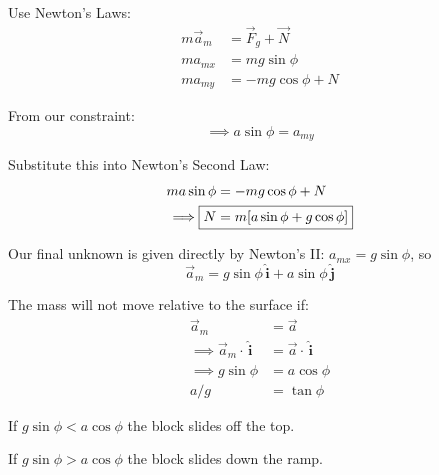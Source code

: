 \documentclass[twoside]{scrartcl}
\let\oldhat\hat
\renewcommand{\hat}[1]{\,\oldhat{\boldsymbol{\mathbf{#1}}}}
\begin{document}
\begin{example}
Use Newton's Laws:
\[
\begin{aligned}
  m\vec{a}_m &= \vec{F}_g + \vec{N}\\
  ma_{mx} &= mg\sin\phi\\
  ma_{my} &= -mg\cos\phi + N
\end{aligned}
\]

From our constraint: 
\[\implies a\sin\phi = a_{my}\]

Substitute this into Newton's Second Law: 
\[
\begin{aligned}
  ma\sin\phi &= -mg\cos\phi + N\\
  \implies \Aboxed{N &= m[a\sin\phi + g\cos\phi]}
\end{aligned}
\]

Our final unknown is given directly by Newton's II: $a_{mx} = g\sin\phi$, so
\[\boxed{\vec{a}_m = g\sin\phi \hat{i} + a\sin\phi\hat{j}}\]

The mass will not move relative to the surface if: 
\[
\begin{aligned}
  \vec{a}_m &= \vec{a}\\
  \implies \vec{a}_m\cdot\hat{i} &= \vec{a}\cdot\hat{i}\\
  \implies g\sin\phi &= a\cos\phi\\
  a/g &= \tan\phi 
\end{aligned}
\]

If $g\sin\phi < a\cos\phi$ the block slides off the top. 

If $g\sin\phi > a\cos\phi$ the block slides down the ramp. 

\end{example}
\pagebreak
\end{document}
